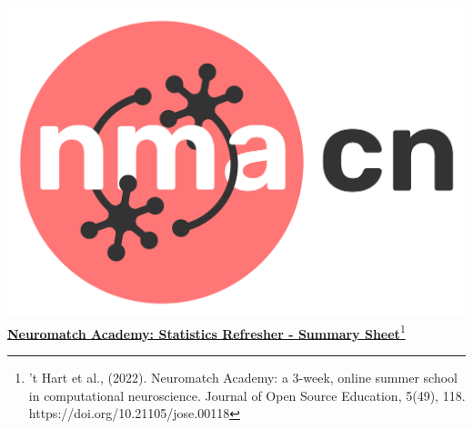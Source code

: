 \documentclass[10pt,a4paper]{article}
\begin{document}
\begin{multicols}{3}

\end{multicols}
\newpage
\clearpage
\includegraphics[scale=0.03]{Figures/NMACN.png}\href{https://compneuro.neuromatch.io/tutorials/intro.html}{\textbf{\Huge{Neuromatch Academy: Statistics Refresher - Summary Sheet}}\footnote{’t Hart et al., (2022). Neuromatch Academy: a 3-week, online summer school in computational neuroscience. Journal of Open Source Education, 5(49), 118. https://doi.org/10.21105/jose.00118}}
\begin{multicols}{3}

\end{multicols}
\end{document}

